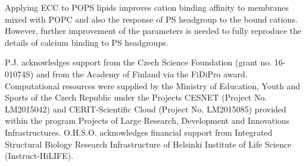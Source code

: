 \documentclass[journal=jpcbfk,manuscript=article]{achemso}
\begin{document}
Applying ECC to POPS lipids improves cation binding affinity to membranes
mixed with POPC and also the response of PS headgroup to the bound cations.
However, further improvement of the parameters is needed to fully reproduce the
details of calcium binding to PS headgroups.
 
\listoftodos
 

\begin{acknowledgement} 
P.J. acknowledges support from the Czech Science Foundation (grant no. 16-01074S)  
and from the Academy of Finland via the FiDiPro award. 
Computational resources were supplied by the Ministry of Education, Youth and Sports 
of the Czech Republic under the Projects CESNET (Project No. LM2015042) and CERIT-Scientific 
Cloud (Project No. LM2015085) provided within the program Projects of Large Research, 
Development and Innovations Infrastructures. 
O.H.S.O. acknowledges financial support from 
Integrated Structural Biology Research Infrastructure of 
Helsinki Institute of Life Science (Instruct-HiLIFE). 
\end{acknowledgement} 
 
\begin{suppinfo} 
 
 
 
\end{suppinfo} 
 
 
 
 
\end{document}
